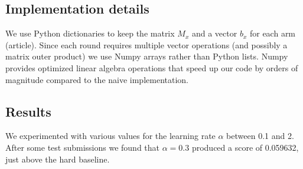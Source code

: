 \documentclass[a4paper, 11pt]{article}
\begin{document}
\subsection{Implementation details}

We use Python dictionaries to keep the matrix $M_x$ and a vector $b_x$ for each arm (article). Since each round requires multiple vector operations (and possibly a matrix outer product) we use Numpy arrays rather than Python lists. Numpy provides optimized linear algebra operations that speed up our code by orders of magnitude compared to the naive implementation.

\subsection{Results}

We experimented with various values for the learning rate $\alpha$ between 0.1 and 2. After some test submissions we found that $\alpha = 0.3$ produced a score of 0.059632, just above the hard baseline.
\end{document}
